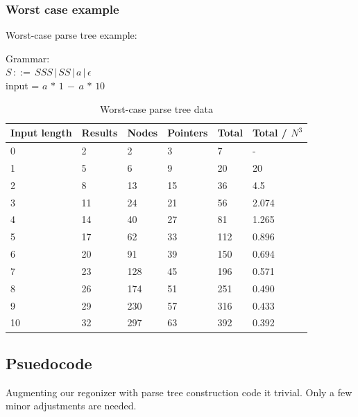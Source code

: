 \documentclass[a4paper,10pt]{article}
\begin{document}
\subsubsection{Worst case example}

Worst-case parse tree example:

Grammar:\\
$S\,::=\,SSS\,|\,SS\,|\,a\,|\,\epsilon$\\
input = $a\,*\,1\,-\,a\,*\,10$

\begin{table}[H]
\centering
\begin{tabular}{ | p{6em} | p{4em} | p{4em} | p{4em} | p{3em} | p{5em} | }
  \hline
  Input length & Results & Nodes & Pointers & Total & Total / $N^{3}$ \\
  \hline
  0 & 2 & 2 & 3 & 7 & - \\
  1 & 5 & 6 & 9 & 20 & 20 \\
  2 & 8 & 13 & 15 & 36 & 4.5 \\
  3 & 11 & 24 & 21 & 56 & 2.074 \\
  4 & 14 & 40 & 27 & 81 & 1.265 \\
  5 & 17 & 62 & 33 & 112 & 0.896 \\
  6 & 20 & 91 & 39 & 150 & 0.694 \\
  7 & 23 & 128 & 45 & 196 & 0.571 \\
  8 & 26 & 174 & 51 & 251 & 0.490 \\
  9 & 29 & 230 & 57 & 316 & 0.433 \\
  10 & 32 & 297 & 63 & 392 & 0.392 \\
  \hline
\end{tabular}
\caption{Worst-case parse tree data}
\end{table}

\subsection{Psuedocode}

Augmenting our regonizer with parse tree construction code it trivial. Only a few minor adjustments are needed.
\end{document}
